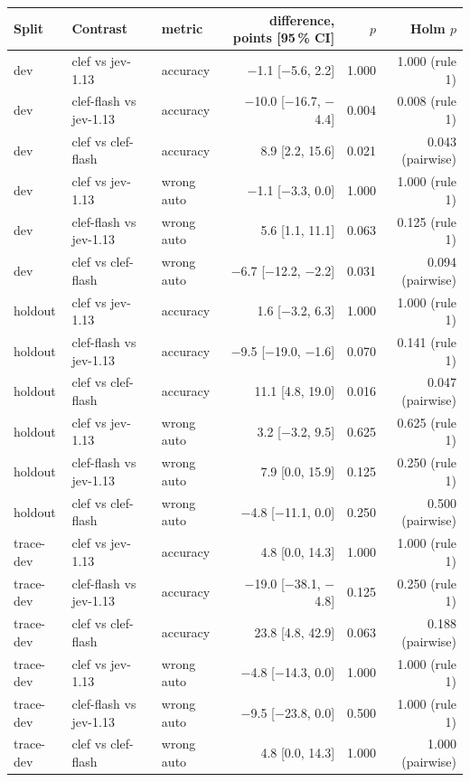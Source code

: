\begin{tabular*}{\textwidth}{@{\extracolsep{\fill}}l l l r r r@{}}
\toprule
Split & Contrast & metric & difference, points [95\,\% CI] & $p$ & Holm $p$ \\
\midrule
dev & clef vs jev-1.13 & accuracy & $-$1.1 [$-$5.6, 2.2] & 1.000 & 1.000 (rule 1) \\
dev & clef-flash vs jev-1.13 & accuracy & $-$10.0 [$-$16.7, $-$4.4] & 0.004 & 0.008 (rule 1) \\
dev & clef vs clef-flash & accuracy & 8.9 [2.2, 15.6] & 0.021 & 0.043 (pairwise) \\
dev & clef vs jev-1.13 & wrong auto & $-$1.1 [$-$3.3, 0.0] & 1.000 & 1.000 (rule 1) \\
dev & clef-flash vs jev-1.13 & wrong auto & 5.6 [1.1, 11.1] & 0.063 & 0.125 (rule 1) \\
dev & clef vs clef-flash & wrong auto & $-$6.7 [$-$12.2, $-$2.2] & 0.031 & 0.094 (pairwise) \\
\addlinespace[2pt]
holdout & clef vs jev-1.13 & accuracy & 1.6 [$-$3.2, 6.3] & 1.000 & 1.000 (rule 1) \\
holdout & clef-flash vs jev-1.13 & accuracy & $-$9.5 [$-$19.0, $-$1.6] & 0.070 & 0.141 (rule 1) \\
holdout & clef vs clef-flash & accuracy & 11.1 [4.8, 19.0] & 0.016 & 0.047 (pairwise) \\
holdout & clef vs jev-1.13 & wrong auto & 3.2 [$-$3.2, 9.5] & 0.625 & 0.625 (rule 1) \\
holdout & clef-flash vs jev-1.13 & wrong auto & 7.9 [0.0, 15.9] & 0.125 & 0.250 (rule 1) \\
holdout & clef vs clef-flash & wrong auto & $-$4.8 [$-$11.1, 0.0] & 0.250 & 0.500 (pairwise) \\
\addlinespace[2pt]
trace-dev & clef vs jev-1.13 & accuracy & 4.8 [0.0, 14.3] & 1.000 & 1.000 (rule 1) \\
trace-dev & clef-flash vs jev-1.13 & accuracy & $-$19.0 [$-$38.1, $-$4.8] & 0.125 & 0.250 (rule 1) \\
trace-dev & clef vs clef-flash & accuracy & 23.8 [4.8, 42.9] & 0.063 & 0.188 (pairwise) \\
trace-dev & clef vs jev-1.13 & wrong auto & $-$4.8 [$-$14.3, 0.0] & 1.000 & 1.000 (rule 1) \\
trace-dev & clef-flash vs jev-1.13 & wrong auto & $-$9.5 [$-$23.8, 0.0] & 0.500 & 1.000 (rule 1) \\
trace-dev & clef vs clef-flash & wrong auto & 4.8 [0.0, 14.3] & 1.000 & 1.000 (pairwise) \\

\end{tabular*}
